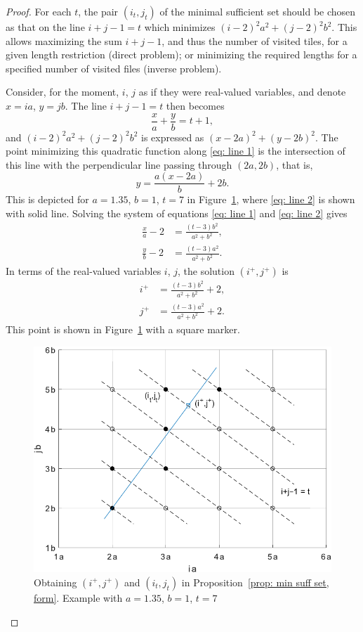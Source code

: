 \documentclass[12pt, a4paper]{article}
\newcommand{\tiles}{t} %
\newcommand{\isolr}{i^+}
\newcommand{\jsolr}{j^+}
\begin{document}
\begin{proof}
For each $\tiles$, the pair $(i_\tiles,j_\tiles)$ of the minimal sufficient set should be chosen as that on the line $i+j-1=\tiles$ which minimizes $(i-2)^2 a^2 + (j-2)^2 b^2$. This allows maximizing the sum $i+j-1$, and thus the number of visited tiles, for a given length restriction (direct problem); or minimizing the required lengths for a specified number of visited files (inverse problem).

Consider, for the moment, $i$, $j$ as if they were real-valued variables, and denote $x=ia$, $y=jb$. The line $i+j-1 = \tiles$ then becomes
\begin{equation}
\label{eq: line 1}
\frac x a + \frac y b = \tiles + 1,
\end{equation}
and $(i-2)^2 a^2 + (j-2)^2 b^2$ is expressed as $(x-2a)^2+(y-2b)^2$. The point minimizing this quadratic function along \eqref{eq: line 1} is the intersection of this line with the perpendicular line passing through $(2a,2b)$, that is,
\begin{equation}
\label{eq: line 2}
y = \frac {a (x-2a)} b + 2b.
\end{equation}
This is depicted for $a=1.35$, $b=1$, $\tiles=7$ in Figure~\ref{fig: min suff set, form}, where \eqref{eq: line 2} is shown with solid line. Solving the system of equations \eqref{eq: line 1} and \eqref{eq: line 2} gives 
\begin{align}
\frac x a - 2 &= \frac{(t-3)b^2}{a^2+b^2}, \\
\frac y b - 2 &= \frac{(t-3)a^2}{a^2+b^2}.
\end{align}
In terms of the real-valued variables $i$, $j$, the solution $(\isolr, \jsolr)$ is
\begin{align}
\label{eq: prop: min suff set, form: isolr}
\isolr &= \frac{(t-3)b^2}{a^2+b^2} + 2, \\
\label{eq: prop: min suff set, form: jsolr}
\jsolr &= \frac{(t-3)a^2}{a^2+b^2} + 2.
\end{align}
This point is shown in Figure~\ref{fig: min suff set, form} with a square marker.

\begin{figure}%
\centering%
\includegraphics[width=.7\textwidth]{mss}%
\caption{Obtaining $(\isolr, \jsolr)$ and $(i_\tiles, j_\tiles)$ in  Proposition~\ref{prop: min suff set, form}. Example with $a=1.35$, $b=1$, $\tiles=7$%
}%
\label{fig: min suff set, form}%
\end{figure}%


\end{proof}
\end{document}

